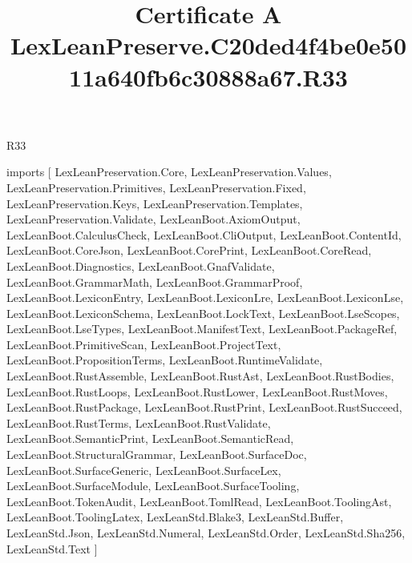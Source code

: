 \begin{lexlean}{R33}
\title{Certificate A LexLeanPreserve.C20ded4f4be0e5011a640fb6c30888a67.R33}
\begin{coremodule}
imports [
  LexLeanPreservation.Core,
  LexLeanPreservation.Values,
  LexLeanPreservation.Primitives,
  LexLeanPreservation.Fixed,
  LexLeanPreservation.Keys,
  LexLeanPreservation.Templates,
  LexLeanPreservation.Validate,
  LexLeanBoot.AxiomOutput,
  LexLeanBoot.CalculusCheck,
  LexLeanBoot.CliOutput,
  LexLeanBoot.ContentId,
  LexLeanBoot.CoreJson,
  LexLeanBoot.CorePrint,
  LexLeanBoot.CoreRead,
  LexLeanBoot.Diagnostics,
  LexLeanBoot.GnafValidate,
  LexLeanBoot.GrammarMath,
  LexLeanBoot.GrammarProof,
  LexLeanBoot.LexiconEntry,
  LexLeanBoot.LexiconLre,
  LexLeanBoot.LexiconLse,
  LexLeanBoot.LexiconSchema,
  LexLeanBoot.LockText,
  LexLeanBoot.LseScopes,
  LexLeanBoot.LseTypes,
  LexLeanBoot.ManifestText,
  LexLeanBoot.PackageRef,
  LexLeanBoot.PrimitiveScan,
  LexLeanBoot.ProjectText,
  LexLeanBoot.PropositionTerms,
  LexLeanBoot.RuntimeValidate,
  LexLeanBoot.RustAssemble,
  LexLeanBoot.RustAst,
  LexLeanBoot.RustBodies,
  LexLeanBoot.RustLoops,
  LexLeanBoot.RustLower,
  LexLeanBoot.RustMoves,
  LexLeanBoot.RustPackage,
  LexLeanBoot.RustPrint,
  LexLeanBoot.RustSucceed,
  LexLeanBoot.RustTerms,
  LexLeanBoot.RustValidate,
  LexLeanBoot.SemanticPrint,
  LexLeanBoot.SemanticRead,
  LexLeanBoot.StructuralGrammar,
  LexLeanBoot.SurfaceDoc,
  LexLeanBoot.SurfaceGeneric,
  LexLeanBoot.SurfaceLex,
  LexLeanBoot.SurfaceModule,
  LexLeanBoot.SurfaceTooling,
  LexLeanBoot.TokenAudit,
  LexLeanBoot.TomlRead,
  LexLeanBoot.ToolingAst,
  LexLeanBoot.ToolingLatex,
  LexLeanStd.Blake3,
  LexLeanStd.Buffer,
  LexLeanStd.Json,
  LexLeanStd.Numeral,
  LexLeanStd.Order,
  LexLeanStd.Sha256,
  LexLeanStd.Text
]


\end{coremodule}
\end{lexlean}
